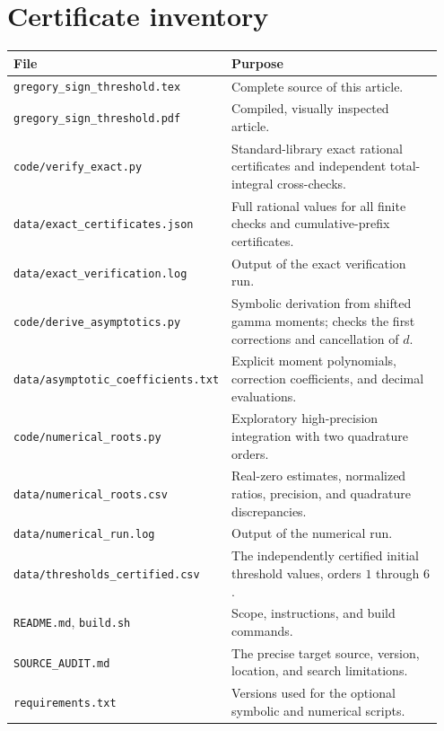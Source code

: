 \documentclass[11pt]{article}
\numberwithin{equation}{section}
\theoremstyle{definition}
\begin{document}
\section{Certificate inventory}\label{sec:inventory}
\begin{longtable}{@{}p{0.42\linewidth}p{0.53\linewidth}@{}}
\toprule
File & Purpose\\
\midrule
\endhead
\texttt{gregory\_sign\_threshold.tex} & Complete source of this article.\\
\texttt{gregory\_sign\_threshold.pdf} & Compiled, visually inspected article.\\
\texttt{code/verify\_exact.py} & Standard-library exact rational certificates and independent total-integral cross-checks.\\
\texttt{data/exact\_certificates.json} & Full rational values for all finite checks and cumulative-prefix certificates.\\
\texttt{data/exact\_verification.log} & Output of the exact verification run.\\
\texttt{code/derive\_asymptotics.py} & Symbolic derivation from shifted gamma moments; checks the first corrections and cancellation of $d$.\\
\texttt{data/asymptotic\_coefficients.txt} & Explicit moment polynomials, correction coefficients, and decimal evaluations.\\
\texttt{code/numerical\_roots.py} & Exploratory high-precision integration with two quadrature orders.\\
\texttt{data/numerical\_roots.csv} & Real-zero estimates, normalized ratios, precision, and quadrature discrepancies.\\
\texttt{data/numerical\_run.log} & Output of the numerical run.\\
\texttt{data/thresholds\_certified.csv} & The independently certified initial threshold values, orders $1$ through $6$.\\
\texttt{README.md}, \texttt{build.sh} & Scope, instructions, and build commands.\\
\texttt{SOURCE\_AUDIT.md} & The precise target source, version, location, and search limitations.\\
\texttt{requirements.txt} & Versions used for the optional symbolic and numerical scripts.\\
\bottomrule
\end{longtable}
\end{document}
